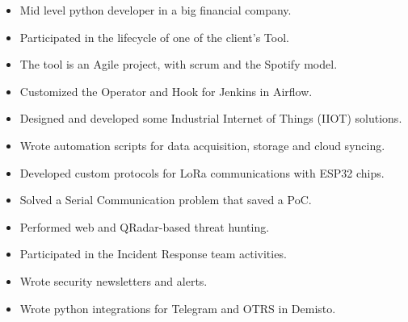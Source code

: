 
\begin{itemize}
  \item Mid level python developer in a big financial company.
  \item Participated in the lifecycle of one of the client's Tool.
  \item The tool is an Agile project, with scrum and the \faSpotify Spotify model.
  \item \faStar Customized the Operator and Hook for Jenkins in Airflow. 
\end{itemize}

\divider

\begin{itemize}
  \item Designed and developed some Industrial Internet of Things (IIOT) solutions.
  \item Wrote automation scripts for data acquisition, storage and cloud syncing.
  \item Developed custom protocols for LoRa communications with ESP32 chips.
  \item \faStar Solved a Serial Communication problem that saved a PoC.
\end{itemize}

\divider

\begin{itemize}
  \item Performed web and QRadar-based threat hunting.
  \item Participated in the Incident Response team activities.
  \item Wrote security newsletters and alerts.
  \item \faStar Wrote python integrations for Telegram and OTRS in Demisto.
\end{itemize}

